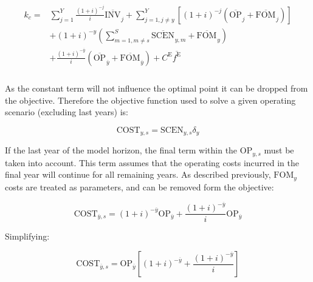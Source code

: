 \documentclass{article}
\newcommand{\sYears}{Y}
\newcommand{\sScenarios}{S}
\newcommand{\iYear}{y}
\newcommand{\iYearTerminal}{\overline{\iYear}}
\newcommand{\iYearAlias}{j}
\newcommand{\iScenario}{s}
\newcommand{\iScenarioAlias}{m}
\newcommand{\cOperatingCost}[1][\iYear,\iScenario]{\mathrm{OP}_{#1}}
\newcommand{\cFixedOperationsMaintenanceCost}[1][\iYear]{\mathrm{FOM}_{#1}}
\newcommand{\cInvestmentCost}[1][\iYear]{\mathrm{INV}_{#1}}
\newcommand{\cInterestRate}{i}
\newcommand{\cEmissionsTargetViolationPenalty}{C^{\mathrm{E}}}
\newcommand{\cObjectiveFunction}{\mathrm{COST}}
\newcommand{\cOperatingCostScenario}[1][\iYear,\iScenario]{\mathrm{SCEN}_{#1}}
\newcommand{\cDiscountRate}[1][\iYear]{\delta_{#1}}
\newcommand{\vEmissionsTargetViolation}{f^{\mathrm{E}}}
\begin{document}
\begin{align}
\begin{split}
	k_{c} = & \sum\limits_{\iYearAlias=1}^{\sYears} \frac{(1+\cInterestRate)^{-\iYearAlias}}{\cInterestRate}\overline{\cInvestmentCost[]}_{\iYearAlias} + \sum\limits_{\iYearAlias=1, \iYearAlias \neq \iYear}^{\sYears} \left[(1+\cInterestRate)^{-\iYearAlias} (\overline{\cOperatingCost[]}_{\iYearAlias} + \overline{\cFixedOperationsMaintenanceCost[]}_{\iYearAlias}) \right]\\
	& + (1 + \cInterestRate)^{-\iYear}\left(\sum\limits_{\iScenarioAlias = 1,\iScenarioAlias\neq \iScenario}^{\sScenarios}\overline{\cOperatingCostScenario[]}_{\iYear,\iScenarioAlias} + \overline{\cFixedOperationsMaintenanceCost[]}_{\iYear}\right)\\
	& + \frac{(1+\cInterestRate)^{-\iYearTerminal}}{\cInterestRate} \left(\overline{\cOperatingCost[]}_{\iYearTerminal} + \overline{\cFixedOperationsMaintenanceCost[]}_{\iYearTerminal} \right) + \cEmissionsTargetViolationPenalty \overline{\vEmissionsTargetViolation}\\
\end{split}
\end{align}

As the constant term will not influence the optimal point it can be dropped from the objective. Therefore the objective function used to solve a given operating scenario (excluding last years) is:

\begin{equation}
	\cObjectiveFunction_{\iYear,\iScenario} = \cOperatingCostScenario\cDiscountRate
\end{equation}

If the last year of the model horizon, the final term within the $\cOperatingCost$ must be taken into account. This term assumes that the operating costs incurred in the final year will continue for all remaining years. As described previously, $\cFixedOperationsMaintenanceCost$ costs are treated as parameters, and can be removed form the objective:

\begin{equation}
	\cObjectiveFunction_{\iYearTerminal,\iScenario} = (1+\cInterestRate)^{-\iYearTerminal} \cOperatingCost[\iYearTerminal] + \frac{(1+\cInterestRate)^{-\iYearTerminal}}{\cInterestRate} \cOperatingCost[\iYearTerminal]
\end{equation}

Simplifying:

\begin{equation}
	\cObjectiveFunction_{\iYearTerminal,\iScenario} = \cOperatingCost[\iYearTerminal]\left[(1+\cInterestRate)^{-\iYearTerminal}  + \frac{(1+\cInterestRate)^{-\iYearTerminal}}{\cInterestRate}\right]
\end{equation}
\end{document}
